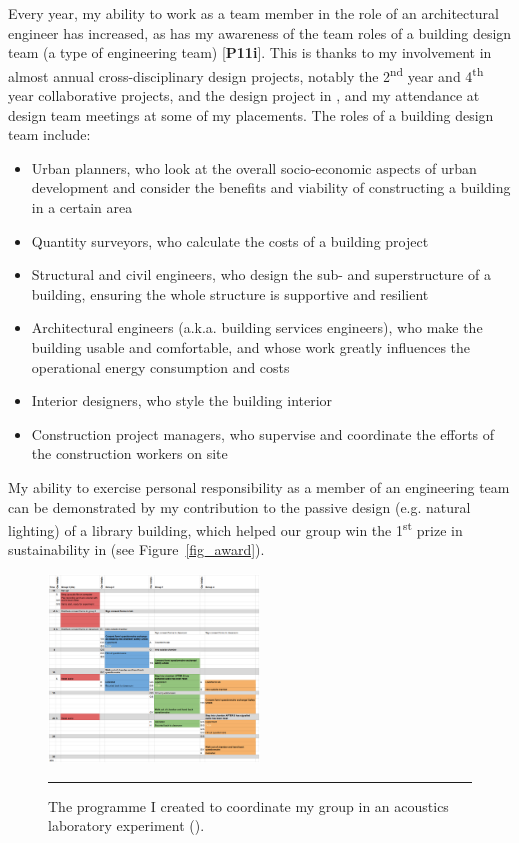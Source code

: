 Every year, my ability to work as a team member in the role of an architectural engineer has increased, as has my awareness of the team roles of a building design team (a type of engineering team) [\textbf{P11i}].
This is thanks to my involvement in almost annual cross-disciplinary design projects, notably the 2\textsuperscript{nd} year and 4\textsuperscript{th} year collaborative projects, and the design project in \CASTitle, and my attendance at design team meetings at some of my placements.
The roles of a building design team include:
\begin{itemize}
    \item Urban planners, who look at the overall socio-economic aspects of urban development and consider the benefits and viability of constructing a building in a certain area
    \item Quantity surveyors, who calculate the costs of a building project
    \item Structural and civil engineers, who design the sub- and superstructure of a building, ensuring the whole structure is supportive and resilient
    \item Architectural engineers (a.k.a. building services engineers), who make the building usable and comfortable, and whose work greatly influences the operational energy consumption and costs
    \item Interior designers, who style the building interior
    \item Construction project managers, who supervise and coordinate the efforts of the construction workers on site
\end{itemize}

My ability to exercise personal responsibility as a member of an engineering team can be demonstrated by my contribution to the passive design (e.g. natural lighting) of a library building, which helped our group win the 1\textsuperscript{st} prize in sustainability in \CASTitle (see Figure~\ref{fig_award}).

\begin{figure}
	\centering
	\includegraphics[width=0.5\textwidth]{figures/lab-gantt.PNG}
	\rule{0.5\textwidth}{0.5pt} %
	\caption[Acoustics experiment programme.]{The programme I created to coordinate my group in an acoustics laboratory experiment (\LAB).}
	\label{fig:lab-gantt}
\end{figure}

